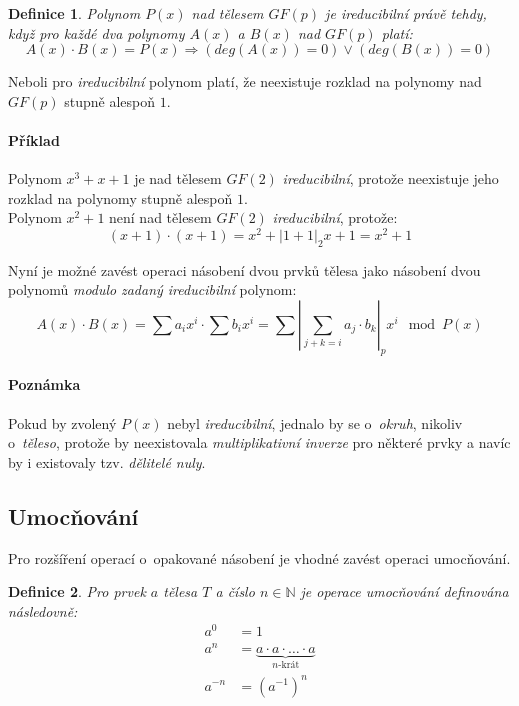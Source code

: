 \documentclass[thesis=M,czech,hidelinks]{FITthesis}[2012/06/26]
\newcommand{\0}{{\textcolor[gray]{0.100}{0}}}
\newtheorem{definice}{Definice}
\begin{document}
\begin{definice}
    Polynom $P(x)$ nad tělesem $GF(p)$ je \emph{ireducibilní} právě tehdy, když
    pro každé dva polynomy $A(x)$ a $B(x)$ nad $GF(p)$ platí:
    $$ A(x) \cdot B(x) = P(x) \Rightarrow \left( deg(A(x)) = 0 \right) \lor
    \left( deg(B(x)) = 0 \right)$$
\end{definice}

Neboli pro \emph{ireducibilní} polynom platí, že neexistuje rozklad na polynomy
nad $GF(p)$ stupně alespoň $1$.

\paragraph{Příklad} Polynom $x^3+x+1$ je nad tělesem $GF(2)$ \emph{ireducibilní},
protože neexistuje jeho rozklad na polynomy stupně alespoň $1$. \\
Polynom $x^2+1$ není nad tělesem $GF(2)$ \emph{ireducibilní}, protože:
$$(x+1)\cdot(x+1) = x^2 + \left|1+1\right|_2x + 1 = x^2+1 $$

Nyní je možné zavést operaci násobení dvou prvků tělesa jako násobení dvou
polynomů \emph{modulo} \emph{zadaný ireducibilní} polynom:
$$ A(x) \cdot B(x) = \sum a_i x^i \cdot \sum b_i x^i =
\sum \left|\sum_{j+k=i} a_j \cdot b_k\right|_p x^i \mod P(x) $$


\paragraph{Poznámka} Pokud by zvolený $P(x)$ nebyl \emph{ireducibilní}, jednalo
by se o~\emph{okruh}, nikoliv o~\emph{těleso}, protože by neexistovala
\emph{multiplikativní inverze} pro některé prvky a navíc by i existovaly
tzv. \emph{dělitelé nuly}.


\subsection{Umocňování}
Pro rozšíření operací o~opakované násobení je vhodné zavést operaci umocňování.

\begin{definice}
    Pro prvek $a$ tělesa $T$ a číslo $n\in\mathbb{N}$ je operace
    umocňování definována následovně:
    \begin{align*}
        a^0     &= 1 \\
        a^n     &= \underbrace{a \cdot a \cdot \ldots \cdot a}_{\text{$n$-krát}} \\
        a^{-n}  &= \left(a^{-1}\right)^n
    \end{align*}
\end{definice}
\end{document}
